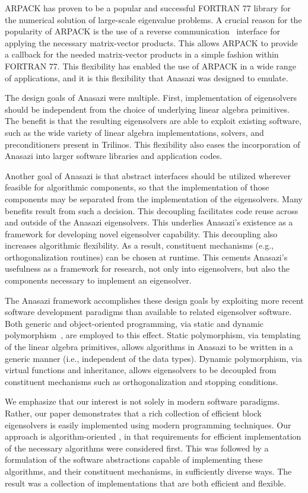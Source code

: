 \documentclass[acmtoms,acmnow]{acmtrans2m}
\begin{document}
ARPACK has proven to be a popular and successful FORTRAN 77 library for the numerical
solution of large-scale eigenvalue problems. A crucial reason for the popularity of ARPACK
is the use of a reverse communication~\cite[p.~3]{lesy:98} interface for applying the
necessary matrix-vector products. This allows ARPACK to provide a callback for the needed
matrix-vector products in a simple fashion within FORTRAN 77. This flexibility has enabled the use of
ARPACK in a wide range of applications, and it is this flexibility that Anasazi was
designed to emulate.

The design goals of Anasazi were multiple. First, implementation of eigensolvers should be
independent from the choice of underlying linear algebra primitives. The benefit is that
the resulting eigensolvers are able to exploit existing software, such as the wide variety
of linear algebra implementations, solvers, and preconditioners present in Trilinos. This
flexibility also eases the incorporation of Anasazi into larger software libraries and
application codes.

Another goal of Anasazi is that abstract interfaces should be utilized wherever feasible
for algorithmic components, so that the implementation of those components may be
separated from the implementation of the eigensolvers. Many benefits result from such a
decision. This decoupling facilitates code reuse across and outside of the Anasazi
eigensolvers. This underlies Anasazi's existence as a framework for developing novel
eigensolver capability. This decoupling also increases algorithmic flexibility. As a
result, constituent mechanisms (e.g., orthogonalization routines) can be chosen at
runtime. This cements Anasazi's usefulness as a framework for research, not only into
eigensolvers, but also the components necessary to implement an eigensolver.

The Anasazi framework accomplishes these design goals by exploiting more recent software
development paradigms than available to related eigensolver software. Both generic and
object-oriented programming, via static and dynamic polymorphism~\cite[Chapter 14]{VJ02},
are employed to this effect. Static polymorphism, via templating of the linear algebra
primitives, allows algorithms in Anasazi to be written in a generic manner (i.e.,
independent of the data types). Dynamic polymorphism, via virtual functions and
inheritance, allows eigensolvers to be decoupled from constituent mechanisms such as
orthogonalization and stopping conditions. 

We emphasize that our interest is not solely in modern software paradigms. Rather, our
paper demonstrates that a rich collection of efficient block eigensolvers is easily
implemented using modern programming techniques. Our approach is algorithm-oriented
\cite{muov:94}, in that requirements for efficient implementation of the necessary
algorithms were considered first. This was followed by a formulation of the software
abstractions capable of implementing these algorithms, and their constituent mechanisms,
in sufficiently diverse ways. The result was a collection of implementations that are both
efficient and flexible. 
\end{document}
